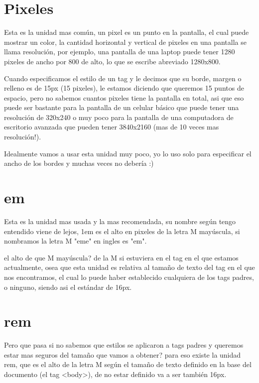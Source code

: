 \documentclass[letterpaper,10pt,spanish]{sphinxmanual}
\begin{document}
\section{Pixeles}
\label{\detokenize{haciendo-lugar:pixeles}}
Esta es la unidad mas común, un pixel es un punto en la pantalla, el cual puede
mostrar un color, la cantidad horizontal y vertical de pixeles en una pantalla
se llama resolución, por ejemplo, una pantalla de una laptop puede tener 1280
pixeles de ancho por 800 de alto, lo que se escribe abreviado 1280x800.

Cuando especificamos el estilo de un tag y le decimos que su borde, margen o
relleno es de 15px (15 pixeles), le estamos diciendo que queremos 15 puntos de
espacio, pero no sabemos cuantos pixeles tiene la pantalla en total, asi que
eso puede ser bastante para la pantalla de un celular básico que puede tener
una resolución de 320x240 o muy poco para la pantalla de una computadora de
escritorio avanzada que pueden tener 3840x2160 (mas de 10 veces mas resolución!).

Idealmente vamos a usar esta unidad muy poco, yo lo uso solo para especificar
el ancho de los bordes y muchas veces no debería :)


\section{em}
\label{\detokenize{haciendo-lugar:em}}
Esta es la unidad mas usada y la mas recomendada, su nombre según tengo
entendido viene de lejos, 1em es el alto en pixeles de la letra M mayúscula, si
nombramos la letra M "eme" en ingles es "em".

el alto de que M mayúscula? de la M si estuviera en el tag en el que estamos
actualmente, osea que esta unidad es relativa al tamaño de texto del tag en el
que nos encontramos, el cual lo puede haber establecido cualquiera de los tags
padres, o ninguno, siendo asi el estándar de 16px.


\section{rem}
\label{\detokenize{haciendo-lugar:rem}}
Pero que pasa si no sabemos que estilos se aplicaron a tags padres y queremos
estar mas seguros del tamaño que vamos a obtener? para eso existe la unidad
rem, que es el alto de la letra M según el tamaño de texto definido en la base
del documento (el tag \textless{}body\textgreater{}), de no estar definido va a ser también 16px.
\end{document}
